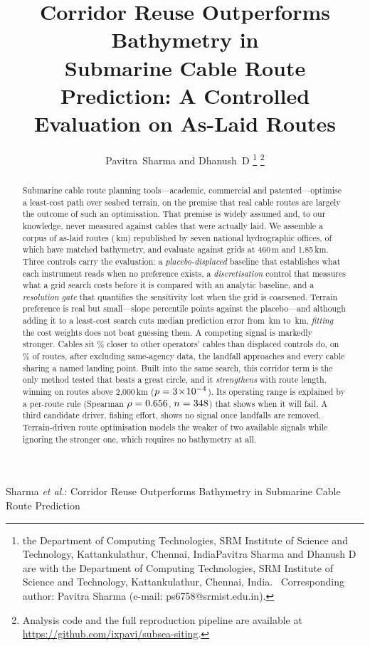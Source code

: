 \documentclass[journal]{IEEEtran}
\newcommand*{\authoraffiliation}{the Department of Computing Technologies,
SRM Institute of Science and Technology, Kattankulathur, Chennai, India}
\begin{document}
\title{Corridor Reuse Outperforms Bathymetry in\\
Submarine Cable Route Prediction: A Controlled\\
Evaluation on \nCorpusRoutes{} As-Laid Routes}

\author{Pavitra~Sharma and Dhanush~D%
\thanks{\ifx\authoraffiliation\empty\else Pavitra Sharma and Dhanush D are
with \authoraffiliation.\ \fi
Corresponding author: Pavitra Sharma\hfil\break
(e-mail: ps6758@srmist.edu.in).}%
\thanks{Analysis code and the full reproduction pipeline are available at
\url{https://github.com/ixpavi/subsea-siting}.}}

\markboth{}%
{Sharma \MakeLowercase{\textit{et al.}}: Corridor Reuse Outperforms Bathymetry
in Submarine Cable Route Prediction}

\maketitle

\begin{abstract}
Submarine cable route planning tools---academic, commercial and
patented---optimise a least-cost path over seabed terrain, on the premise that
real cable routes are largely the outcome of such an optimisation. That premise
is widely assumed and, to our knowledge, never measured against cables that
were actually laid. We assemble a corpus of \nCorpusRoutes{} as-laid routes
(\nCorpusKm{}\,km) republished by seven national hydrographic offices, of which
\nBathyRoutes{} have matched bathymetry, and evaluate against grids at 460\,m
and 1.85\,km. Three controls carry the evaluation: a
\emph{placebo-displaced} baseline that establishes what each instrument reads
when no preference exists, a \emph{discretisation} control that measures what a
grid search costs before it is compared with an analytic baseline, and a
\emph{resolution gate} that quantifies the sensitivity lost when the grid is
coarsened. Terrain preference is real but small---slope
\nPlaceboSlope{} percentile points against the placebo---and although adding it
to a least-cost search cuts median prediction error from \nRegSeapath{}\,km to
\nRegFitted{}\,km, \emph{fitting} the cost weights does not beat guessing them.
A competing signal is markedly stronger. Cables sit \nCorridorCtl\% closer to
other operators' cables than displaced controls do, on \nCorridorCtlPct\% of
routes, after excluding same-agency data, the landfall approaches and every
cable sharing a named landing point. Built into the same search, this corridor
term is the only method tested that beats a great circle, and it
\emph{strengthens} with route length, winning on \nLongHaulWin{} routes above
2{,}000\,km ($p=3\!\times\!10^{-4}$). Its operating range is explained by a per-route
rule (Spearman $\rho=0.656$, $n=348$) that shows when it will fail.
A third candidate driver, fishing effort, shows no signal once landfalls are
removed. Terrain-driven route optimisation models the weaker of two available
signals while ignoring the stronger one, which requires no bathymetry at all.
\end{abstract}
\end{document}
